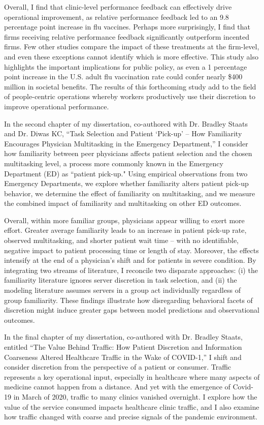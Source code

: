 Overall, I find that clinic-level performance feedback can effectively drive operational improvement, as relative performance feedback led to an 9.8 percentage point increase in flu vaccines. Perhaps more surprisingly, I find that firms receiving relative performance feedback significantly outperform incented firms. Few other studies compare the impact of these treatments at the firm-level, and even these exceptions cannot identify which is more effective. This study also highlights the important implications for public policy, as even a 1 percentage point increase in the U.S. adult flu vaccination rate could confer nearly \$400 million in societal benefits. The results of this forthcoming study add to the field of people-centric operations whereby workers productively use their discretion to improve operational performance.

In the second chapter of my dissertation, co-authored with Dr. Bradley Staats and Dr. Diwas KC, “Task Selection and Patient ‘Pick-up’ – How Familiarity Encourages Physician Multitasking in the Emergency Department,” I consider how familiarity between peer physicians affects patient selection and the chosen multitasking level, a process more commonly known in the Emergency Department (ED) as “patient pick-up." Using empirical observations from two Emergency Departments, we explore whether familiarity alters patient pick-up behavior, we determine the effect of familiarity on multitasking, and we measure the combined impact of familiarity and multitasking on other ED outcomes.

Overall, within more familiar groups, physicians appear willing to exert more effort. Greater average familiarity leads to an increase in patient pick-up rate, observed multitasking, and shorter patient wait time -- with no identifiable, negative impact to patient processing time or length of stay. Moreover, the effects intensify at the end of a physician’s shift and for patients in severe condition. By integrating two streams of literature, I reconcile two disparate approaches: (i) the familiarity literature ignores server discretion in task selection, and (ii) the modeling literature assumes servers in a group act individually regardless of group familiarity. These findings illustrate how disregarding behavioral facets of discretion might induce greater gaps between model predictions and observational outcomes.
	
In the final chapter of my dissertation, co-authored with Dr. Bradley Staats, entitled “The Value Behind Traffic: How Patient Discretion and Information Coarseness Altered Healthcare Traffic in the Wake of COVID-1,” I shift and consider discretion from the perspective of a patient or consumer. Traffic represents a key operational input, especially in healthcare where many aspects of medicine cannot happen from a distance. And yet with the emergence of Covid-19 in March of 2020, traffic to many clinics vanished overnight. I explore how the value of the service consumed impacts healthcare clinic traffic, and I also examine how traffic changed with coarse and precise signals of the pandemic environment.

